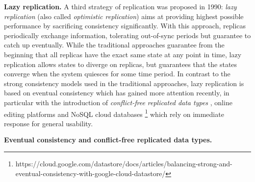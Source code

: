 \textbf{Lazy replication.} A third strategy of replication was proposed in 1990: \textit{lazy replication} \cite{Ladin:1990,Ladin:1992} (also called \textit{optimistic replication}) aims at providing highest possible performance by sacrificing consistency significantly. With this approach, replicas periodically exchange information, tolerating out-of-sync periods but guarantee to catch up eventually. While the traditional approaches guarantee from the beginning that all replicas have the exact same state at any point in time, lazy replication allows states to diverge on replicas, but guarantees that the states converge when the system quiesces for some time period. In contrast to the strong consistency models used in the traditional approaches, lazy replication is based on eventual consistency which has gained more attention recently, in particular with the introduction of \textit{conflict-free replicated data types} \cite{Shapiro:2011}, online editing platforms and NoSQL cloud databases \footnote{https://cloud.google.com/datastore/docs/articles/balancing-strong-and-eventual-consistency-with-google-cloud-datastore/} which rely on immediate response for general usability.

\textbf{Eventual consistency and conflict-free replicated data types.}

 
